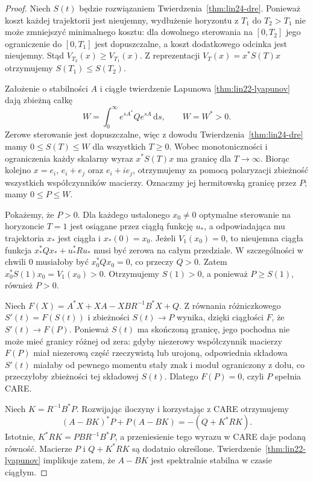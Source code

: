 \begin{proof}
Niech \(S(t)\) będzie
rozwiązaniem
Twierdzenia~\ref{thm:lin24-dre}.
Ponieważ koszt każdej trajektorii
jest nieujemny,
wydłużenie horyzontu
z \(T_1\) do \(T_2>T_1\)
nie może zmniejszyć
minimalnego kosztu:
dla dowolnego sterowania
na \([0,T_2]\)
jego ograniczenie do
\([0,T_1]\) jest dopuszczalne,
a koszt dodatkowego odcinka
jest nieujemny.
Stąd \(V_{T_2}(x)\ge V_{T_1}(x)\).
Z reprezentacji
\(V_T(x)=x^*S(T)x\)
otrzymujemy
\(S(T_1)\le S(T_2)\).

Założenie o stabilności \(A\)
i ciągłe twierdzenie Lapunowa
\ref{thm:lin22-lyapunov}
dają zbieżną całkę
\[
 W=\int_0^\infty e^{sA^*}Qe^{sA}\,\mathrm ds,
 \qquad W=W^*>0.
\]
Zerowe sterowanie
jest dopuszczalne,
więc z dowodu
Twierdzenia~\ref{thm:lin24-dre}
mamy \(0\le S(T)\le W\)
dla wszystkich \(T\ge0\).
Wobec monotoniczności
i ograniczenia
każdy skalarny wyraz
\(x^*S(T)x\) ma granicę
dla \(T\to\infty\).
Biorąc kolejno
\(x=e_i\), \(e_i+e_j\)
oraz \(e_i+ie_j\),
otrzymujemy za pomocą
polaryzacji zbieżność
wszystkich współczynników
macierzy. Oznaczmy jej
hermitowską granicę przez \(P\);
mamy \(0\le P\le W\).

Pokażemy, że \(P>0\).
Dla każdego ustalonego
\(x_0\ne0\)
optymalne sterowanie
na horyzoncie \(T=1\)
jest osiągane przez
ciągłą funkcję \(u_*\),
a odpowiadająca mu trajektoria
\(x_*\) jest ciągła
i \(x_*(0)=x_0\).
Jeżeli
\(V_1(x_0)=0\),
to nieujemna ciągła
funkcja
\(x_*^*Qx_*+u_*^*Ru_*\)
musi być zerowa na
całym przedziale.
W szczególności w chwili
\(0\) musiałoby być
\(x_0^*Qx_0=0\),
co przeczy \(Q>0\).
Zatem
\(x_0^*S(1)x_0=V_1(x_0)>0\).
Otrzymujemy \(S(1)>0\),
a ponieważ \(P\ge S(1)\),
również \(P>0\).

Niech
\(F(X)=A^*X+XA-XBR^{-1}B^*X+Q\).
Z równania różniczkowego
\(S'(t)=F(S(t))\)
i zbieżności \(S(t)\to P\)
wynika, dzięki ciągłości \(F\),
że \(S'(t)\to F(P)\).
Ponieważ \(S(t)\)
ma skończoną granicę,
jego pochodna nie może
mieć granicy różnej od zera:
gdyby niezerowy współczynnik
macierzy \(F(P)\)
miał niezerową część
rzeczywistą lub urojoną,
odpowiednia składowa
\(S'(t)\) miałaby od pewnego
momentu stały znak i moduł
ograniczony z dołu,
co przeczyłoby zbieżności
tej składowej \(S(t)\).
Dlatego \(F(P)=0\),
czyli \(P\) spełnia CARE.

Niech \(K=R^{-1}B^*P\).
Rozwijając iloczyny
i korzystając z CARE
otrzymujemy
\[
 (A-BK)^*P+P(A-BK)
 =-(Q+K^*RK).
\]
Istotnie,
\(K^*RK=PBR^{-1}B^*P\),
a przeniesienie
tego wyrazu w CARE
daje podaną równość.
Macierze \(P\) i
\(Q+K^*RK\) są dodatnio
określone.
Twierdzenie~\ref{thm:lin22-lyapunov}
implikuje zatem, że
\(A-BK\) jest spektralnie
stabilna w czasie ciągłym.


\end{proof}
